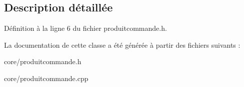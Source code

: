 \subsection{Description détaillée}


Définition à la ligne 6 du fichier produitcommande.h.



La documentation de cette classe a été générée à partir des fichiers suivants :\begin{DoxyCompactItemize}
\item 
core/produitcommande.h\item 
core/produitcommande.cpp\end{DoxyCompactItemize}
